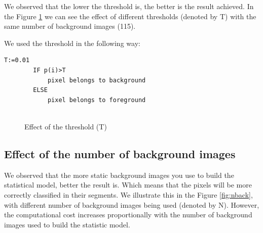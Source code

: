 \documentclass{article}
\begin{document}
	We observed that the lower the threshold is, the better is the result achieved. In the Figure \ref{fig:threshold} we can see the effect of different thresholds (denoted by T) with the same number of background images (115).

	We used the threshold in the following way:

	\begin{lstlisting}[frame=single]
		T:=0.01
		IF p(i)>T
			pixel belongs to background
		ELSE
			pixel belongs to foreground
		
	\end{lstlisting}

	\begin{figure}[H]
		  \centering
		  \caption{Effect of the threshold (T)}
		  \label{fig:threshold}
	\end{figure}

\subsection{Effect of the number of background images}

	We observed that the more static background images you use to build the statistical model, better the result is. Which means that the pixels will be more correctly classified in their segments. We illustrate this in the Figure \ref{fig:nback}, with different number of background images being used (denoted by N). However, the computational cost increases proportionally with the number of background images used to build the statistic model.
\end{document}
